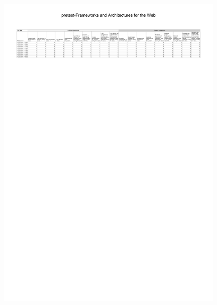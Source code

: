 \begin{figure}[H]
  \centering
    \includegraphics[angle=90]{sections/appendicies/data3.pdf}
    \caption*{}
\end{figure}

